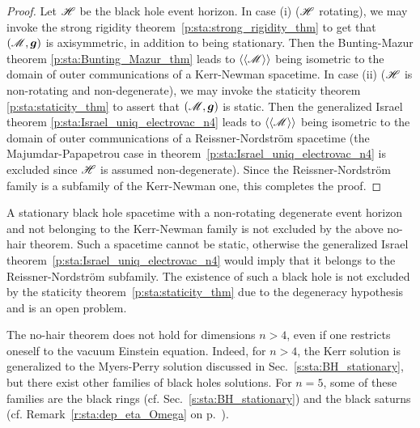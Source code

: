 \begin{proof}
Let $\mathscr{H}$ be the black hole event horizon.
In case (i) ($\mathscr{H}$ rotating), we may invoke the strong rigidity
theorem~\ref{p:sta:strong_rigidity_thm} to get that $(\mathscr{M},\bm{g})$
is axisymmetric, in addition to being stationary. Then the
Bunting-Mazur theorem \ref{p:sta:Bunting_Mazur_thm} leads to
$\langle\langle \mathscr{M}\rangle\rangle$ being isometric
to the domain of outer communications of a Kerr-Newman spacetime.
In case (ii) ($\mathscr{H}$ is non-rotating and
non-degenerate), we
may invoke the staticity theorem \ref{p:sta:staticity_thm}
to assert that $(\mathscr{M},\bm{g})$ is static. Then the generalized Israel
theorem \ref{p:sta:Israel_uniq_electrovac_n4} leads to $\langle\langle \mathscr{M}\rangle\rangle$
being isometric to the domain of outer communications of a Reissner-Nordström
spacetime (the Majumdar-Papapetrou case in theorem~\ref{p:sta:Israel_uniq_electrovac_n4}
is excluded since $\mathscr{H}$ is assumed non-degenerate). Since the Reissner-Nordström
family is a subfamily of the Kerr-Newman one, this completes the proof.
\end{proof}

\begin{remark}
A stationary black hole spacetime with a non-rotating degenerate
event horizon and not belonging to the Kerr-Newman family
is not excluded by the above no-hair theorem. Such a spacetime cannot be static,
otherwise the generalized Israel theorem~\ref{p:sta:Israel_uniq_electrovac_n4}
would imply that it belongs to the Reissner-Nordström subfamily.
The existence of such a black hole is not excluded by the staticity
theorem~\ref{p:sta:staticity_thm} due to the degeneracy hypothesis
and is an open problem.
\end{remark}

\begin{remark}
The no-hair theorem does not hold for dimensions $n > 4$, even if one restricts
oneself to the vacuum Einstein equation. Indeed, for $n> 4$, the
Kerr solution is generalized to the Myers-Perry solution
discussed in Sec.~\ref{s:sta:BH_stationary}, but there exist other families
of black holes solutions. For $n=5$, some of these families are the black
rings (cf. Sec.~\ref{s:sta:BH_stationary}) and the
black saturns (cf. Remark~\ref{r:sta:dep_eta_Omega} on
p.~\pageref{r:sta:dep_eta_Omega}).
\end{remark}

